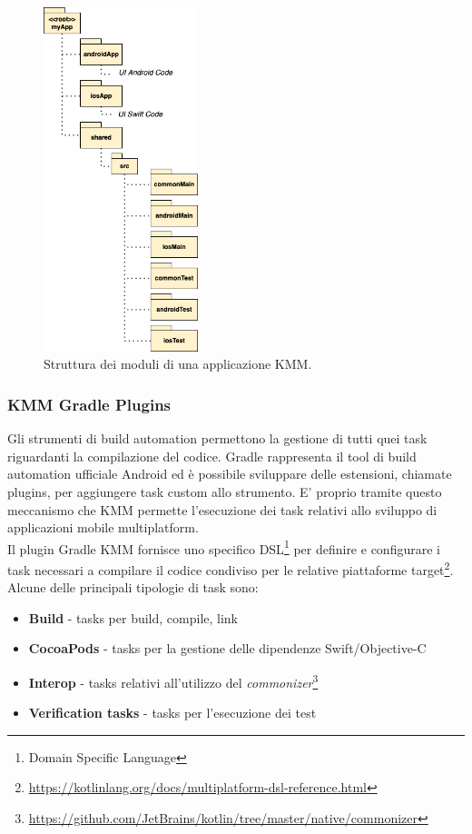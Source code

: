 \begin{figure}[H]
\centering
\includegraphics[width=0.4\textwidth]{img/struttura_app_kmm.png}
\caption{Struttura dei moduli di una applicazione KMM.}
\end{figure}

\subsubsection{KMM Gradle Plugins}
Gli strumenti di build automation permettono la gestione di tutti quei task riguardanti la compilazione del codice. Gradle rappresenta il tool di build automation ufficiale Android ed è possibile sviluppare delle estensioni, chiamate plugins, per aggiungere task custom allo strumento. E' proprio tramite questo meccanismo che KMM permette l'esecuzione dei task relativi allo sviluppo di applicazioni mobile multiplatform.\\
Il plugin Gradle KMM fornisce uno specifico DSL\footnote{Domain Specific Language} per definire e configurare i task necessari a compilare il codice condiviso per le relative piattaforme target\footnote{\href{https://kotlinlang.org/docs/multiplatform-dsl-reference.html}{https://kotlinlang.org/docs/multiplatform-dsl-reference.html}}. Alcune delle principali tipologie di task sono:

\begin{itemize}
    \item \textbf{Build} - tasks per build, compile, link
    \item \textbf{CocoaPods} - tasks per la gestione delle dipendenze Swift/Objective-C
    \item \textbf{Interop} - tasks relativi all'utilizzo del \textit{commonizer}\footnote{\href{https://github.com/JetBrains/kotlin/tree/master/native/commonizer}{https://github.com/JetBrains/kotlin/tree/master/native/commonizer}}
    \item \textbf{Verification tasks} - tasks per l'esecuzione dei test
\end{itemize}

